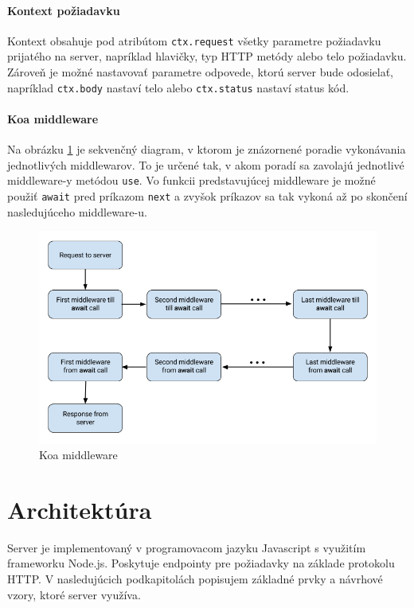 \documentclass[
  digital, %
  table,   %
  lof,     %
  lot,     %
]{fithesis3}
\begin{document}
\paragraph{Kontext požiadavku}
Kontext obsahuje pod atribútom \texttt{ctx.request} všetky parametre požiadavku prijatého na server, napríklad hlavičky, typ HTTP metódy alebo telo požiadavku. Zároveň je možné nastavovať parametre odpovede, ktorú server bude odosielať, napríklad \texttt{ctx.body} nastaví telo alebo \texttt{ctx.status} nastaví status kód.

\paragraph{Koa middleware}
Na obrázku \ref{fig:koa-middleware} je sekvenčný diagram, v ktorom je znázornené poradie vykonávania jednotlivých middlewarov. To je určené tak, v akom poradí sa zavolajú jednotlivé middleware-y metódou \texttt{use}. Vo funkcii predstavujúcej middleware je možné použiť \texttt{await} pred príkazom 
\texttt{next} a zvyšok príkazov sa tak vykoná až po skončení nasledujúceho middleware-u.


\begin{figure}
	\begin{center}
	\includegraphics[width=\textwidth]{img/koa-middleware.png}
	\end{center}
    \caption{Koa middleware}
	\label{fig:koa-middleware}
\end{figure}


\section{Architektúra}
Server je implementovaný v programovacom jazyku Javascript s využitím frameworku Node.js. Poskytuje endpointy pre požiadavky na základe protokolu HTTP. V nasledujúcich podkapitolách popisujem základné prvky a návrhové vzory, ktoré server využíva.
\end{document}
